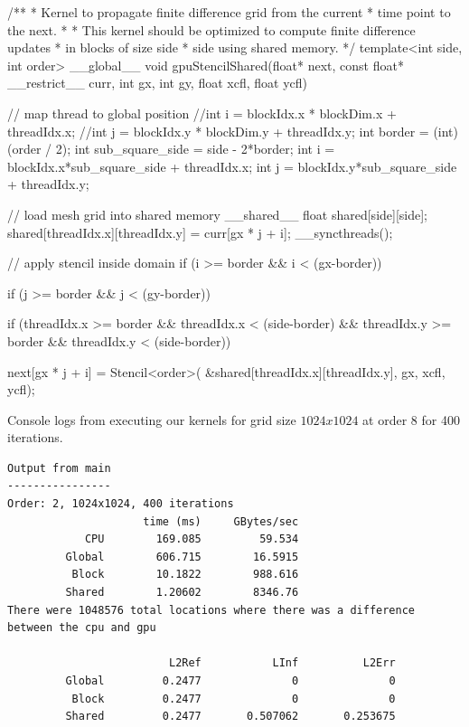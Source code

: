\documentclass[12pt,letterpaper,twoside]{article}
\begin{document}
\begin{cpp}
/**
* Kernel to propagate finite difference grid from the current
* time point to the next.
*
* This kernel should be optimized to compute finite difference updates
* in blocks of size side * side using shared memory.
*/
template<int side, int order>
__global__
void gpuStencilShared(float* next, const float* __restrict__ curr, int gx, int gy,
                float xcfl, float ycfl) {
    
    // map thread to global position
    //int i = blockIdx.x * blockDim.x + threadIdx.x;
    //int j = blockIdx.y * blockDim.y + threadIdx.y;
    int border = (int) (order / 2);
    int sub_square_side = side - 2*border;
    int i = blockIdx.x*sub_square_side + threadIdx.x;
    int j = blockIdx.y*sub_square_side + threadIdx.y;

    // load mesh grid into shared memory
    __shared__ float shared[side][side];
    shared[threadIdx.x][threadIdx.y] = curr[gx * j + i];
    __syncthreads();

    // apply stencil inside domain
    if (i >= border && i < (gx-border)) {
        if (j >= border && j < (gy-border)) {
    
        if (threadIdx.x >= border && threadIdx.x < (side-border) &&
            threadIdx.y >= border && threadIdx.y < (side-border)) {
        
            next[gx * j + i] = Stencil<order>(
                &shared[threadIdx.x][threadIdx.y], 
                gx, 
                xcfl, 
                ycfl);
            }
        }
    }

}
   
\end{cpp}


Console logs from executing our kernels for grid size $1024x1024$
at order 8 for 400 iterations.

\begin{verbatim}
Output from main
----------------
Order: 2, 1024x1024, 400 iterations
                     time (ms)     GBytes/sec
            CPU        169.085         59.534
         Global        606.715        16.5915
          Block        10.1822        988.616
         Shared        1.20602        8346.76
There were 1048576 total locations where there was a difference between the cpu and gpu

                         L2Ref           LInf          L2Err
         Global         0.2477              0              0
          Block         0.2477              0              0
         Shared         0.2477       0.507062       0.253675
\end{verbatim}
\end{document}
